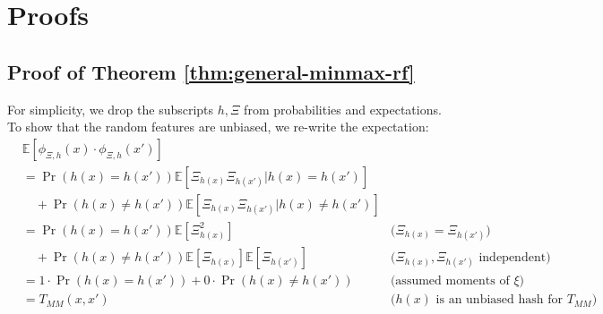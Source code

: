 \section{Proofs}\label{proofs in appendix}

\subsection{Proof of Theorem \ref{thm:general-minmax-rf}}\label{apdx:minmax-rf-proof}

    For simplicity, we drop the subscripts $h,\Xi$ from probabilities and expectations. To show that the random features are unbiased, we re-write the expectation:
    \begin{align*}
    &\mathbb{E}\left[ \phi_{\Xi,h}(x)\cdot \phi_{\Xi,h}(x')\right]  & \\
        &= \Pr(h(x)=h(x')) \mathbb{E} \left[ \Xi_{h(x)}\Xi_{h(x')} | h(x)=h(x')\right]  \nonumber & \\
           &\quad+ \Pr(h(x)\neq h(x')) \mathbb{E} \left[ \Xi_{h(x)}\Xi_{h(x')} | h(x)\neq h(x')\right] &\\
        &= \Pr(h(x)=h(x')) \mathbb{E} \left[ \Xi_{h(x)}^2 \right] &\text{(}\Xi_{h(x)}=\Xi_{h(x')}\text{)} \nonumber \\
        &\quad+ \Pr(h(x)\neq h(x')) \mathbb{E} \left[\Xi_{h(x)}\right] \mathbb{E} \left[\Xi_{h(x')}\right] & (\Xi_{h(x)},\Xi_{h(x')}\text{ independent)} \\
        &= 1\cdot \Pr(h(x)=h(x')) + 0\cdot \Pr(h(x)\neq h(x')) &\text{(assumed moments of }\xi) \\
        &= T_{MM}(x,x')& \text{($h(x)$ is an unbiased hash for $T_{MM}$)}
    \end{align*}

